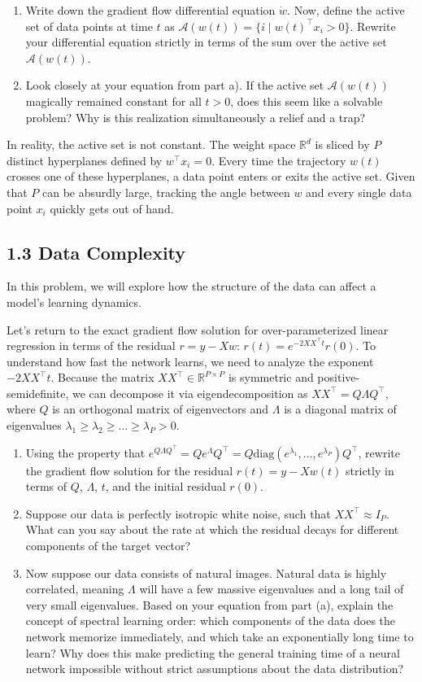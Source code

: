 \begin{enumerate}[label=\alph*)]
    \item Write down the gradient flow differential equation $\dot{w}$. Now, define the active set of data points at time $t$ as $\mathcal{A}(w(t)) = \{ i \mid w(t)^\top x_i > 0 \}$. Rewrite your differential equation strictly in terms of the sum over the active set $\mathcal{A}(w(t))$.
    \item Look closely at your equation from part a). If the active set $\mathcal{A}(w(t))$ magically remained constant for all $t > 0$, does this seem like a solvable problem? Why is this realization simultaneously a relief and a trap?
\end{enumerate}

In reality, the active set is not constant. The weight space $\mathbb{R}^d$ is sliced by $P$ distinct hyperplanes defined by $w^\top x_i = 0$. Every time the trajectory $w(t)$ crosses one of these hyperplanes, a data point enters or exits the active set. Given that $P$ can be absurdly large, tracking the angle between $w$ and every single data point $x_i$ quickly gets out of hand.

\subsection*{1.3 Data Complexity}
In this problem, we will explore how the structure of the data can affect a model's learning dynamics.

Let's return to the exact gradient flow solution for over-parameterized linear regression in terms of the residual $r = y-Xw$: $r(t) = e^{-2XX^\top t}r(0)$. To understand how fast the network learns, we need to analyze the exponent $-2XX^\top t$. Because the matrix $XX^\top \in \mathbb{R}^{P \times P}$ is symmetric and positive-semidefinite, we can decompose it via eigendecomposition as $XX^\top = Q \Lambda Q^\top$, where $Q$ is an orthogonal matrix of eigenvectors and $\Lambda$ is a diagonal matrix of eigenvalues $\lambda_1 \geq \lambda_2 \geq \dots \geq \lambda_P > 0$.
\begin{enumerate}[label=\alph*)]
    \item Using the property that $e^{Q \Lambda Q^\top} = Q e^\Lambda Q^\top=Q\mathrm{diag}(e^{\lambda_1},\dots,e^{\lambda_P})Q^\top$, rewrite the gradient flow solution for the residual $r(t) = y - Xw(t)$ strictly in terms of $Q$, $\Lambda$, $t$, and the initial residual $r(0)$.
    \item Suppose our data is perfectly isotropic white noise, such that $XX^\top \approx I_P$. What can you say about the rate at which the residual decays for different components of the target vector?
    \item Now suppose our data consists of natural images. Natural data is highly correlated, meaning $\Lambda$ will have a few massive eigenvalues and a long tail of very small eigenvalues. Based on your equation from part (a), explain the concept of spectral learning order: which components of the data does the network memorize immediately, and which take an exponentially long time to learn? Why does this make predicting the general training time of a neural network impossible without strict assumptions about the data distribution?
\end{enumerate}